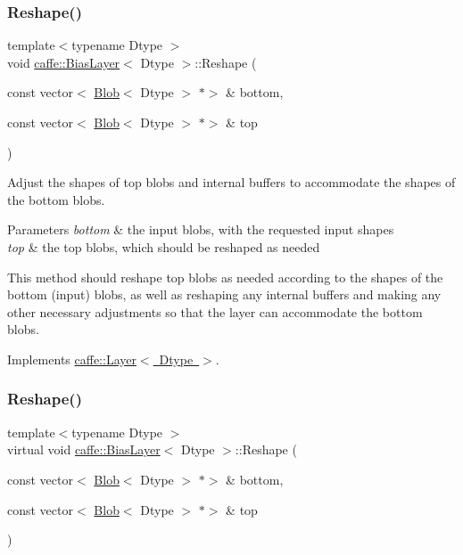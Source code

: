 \subsubsection{\texorpdfstring{Reshape()}{Reshape()}\hspace{0.1cm}{\footnotesize\ttfamily [1/2]}}
{\footnotesize\ttfamily template$<$typename Dtype $>$ \\
void \mbox{\hyperlink{classcaffe_1_1_bias_layer}{caffe\+::\+Bias\+Layer}}$<$ Dtype $>$\+::Reshape (\begin{DoxyParamCaption}\item[{const vector$<$ \mbox{\hyperlink{classcaffe_1_1_blob}{Blob}}$<$ Dtype $>$ $\ast$$>$ \&}]{bottom,  }\item[{const vector$<$ \mbox{\hyperlink{classcaffe_1_1_blob}{Blob}}$<$ Dtype $>$ $\ast$$>$ \&}]{top }\end{DoxyParamCaption})\hspace{0.3cm}{\ttfamily [virtual]}}



Adjust the shapes of top blobs and internal buffers to accommodate the shapes of the bottom blobs. 


\begin{DoxyParams}{Parameters}
{\em bottom} & the input blobs, with the requested input shapes \\
\hline
{\em top} & the top blobs, which should be reshaped as needed\\
\hline
\end{DoxyParams}
This method should reshape top blobs as needed according to the shapes of the bottom (input) blobs, as well as reshaping any internal buffers and making any other necessary adjustments so that the layer can accommodate the bottom blobs. 

Implements \mbox{\hyperlink{classcaffe_1_1_layer_a7fe981e8af8d93d587acf2a952be563d}{caffe\+::\+Layer$<$ Dtype $>$}}.

\mbox{\label{classcaffe_1_1_bias_layer_a00ab608f300c4fa94d75b15ab9e0c599}} 
\subsubsection{\texorpdfstring{Reshape()}{Reshape()}\hspace{0.1cm}{\footnotesize\ttfamily [2/2]}}
{\footnotesize\ttfamily template$<$typename Dtype $>$ \\
virtual void \mbox{\hyperlink{classcaffe_1_1_bias_layer}{caffe\+::\+Bias\+Layer}}$<$ Dtype $>$\+::Reshape (\begin{DoxyParamCaption}\item[{const vector$<$ \mbox{\hyperlink{classcaffe_1_1_blob}{Blob}}$<$ Dtype $>$ $\ast$$>$ \&}]{bottom,  }\item[{const vector$<$ \mbox{\hyperlink{classcaffe_1_1_blob}{Blob}}$<$ Dtype $>$ $\ast$$>$ \&}]{top }\end{DoxyParamCaption})\hspace{0.3cm}{\ttfamily [virtual]}}



